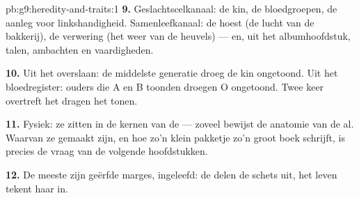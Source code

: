 \begin{solution}{pb:g9:heredity-and-traits:1}
\textbf{9.} Geslachtscelkanaal: de kin, de bloedgroepen, de
aanleg voor linkshandigheid. Samenleefkanaal: de hoest (de
lucht van de bakkerij), de verwering (het weer van de heuvels)
--- en, uit het albumhoofdstuk, talen, ambachten en
vaardigheden.

\textbf{10.} Uit het overslaan: de middelste generatie droeg de
kin ongetoond. Uit het bloedregister: ouders die A en B toonden
droegen O ongetoond. Twee keer overtreft het dragen het tonen.

\textbf{11.} Fysiek: ze zitten in de kernen van de
 --- zoveel bewijst de anatomie van de 
al. Waarvan ze gemaakt zijn, en hoe zo'n klein pakketje zo'n
groot boek schrijft, is precies de vraag van de volgende
hoofdstukken.

\textbf{12.} De meeste  zijn geërfde marges, ingeleefd:
de  delen de schets uit, het leven tekent haar in.
\end{solution}
